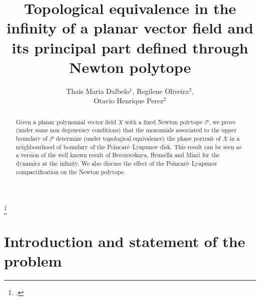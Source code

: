 \documentclass[12pt]{amsart}
\begin{document}
	
\title[Equivalence of planar vector fields near the infinity]
{Topological equivalence in the infinity of a planar vector field and its principal part defined through Newton polytope}


\author[T. M. Dalbelo, R. Oliveira and O. H. Perez]
{Thais Maria Dalbelo$^{1}$, Regilene Oliveira$^{2}$, \\ Otavio Henrique Perez$^{2}$}

\address{$^{1}$Federal University of S\~{a}o Carlos (UFSCar). Rodovia Washington Luís, Km 235, Zip Code 13565-905, S\~{a}o Carlos, S\~{a}o Paulo, Brazil.}

\address{$^{2}$University of S\~{a}o Paulo (USP), Institute of Mathematics and Computer Science. Avenida Trabalhador S\~{a}o Carlense, 400, Zip Code 13566-590, S\~{a}o Carlos, S\~{a}o Paulo, Brazil.}




\thanks{ .}




\date{}
\dedicatory{}
\maketitle

\begin{abstract}
Given a planar polynomial vector field $X$ with a fixed Newton polytope $\mathcal{P}$, we prove (under some non degeneracy conditions) that the monomials associated to the upper boundary of $\mathcal{P}$ determine (under topological equivalence) the phase portrait of $X$ in a neighbourhood of boundary of the Poincaré--Lyapunov disk. This result can be seen as a version of the well known result of Berezovskaya, Brunella and Miari \cite{Berezovskaya,BrunellaMiari} for the dynamics at the infinity, We also discuss the effect of the Poincaré--Lyapunov compactification on the Newton polytope.

\end{abstract}

\section{Introduction and statement of the problem}
\end{document}
